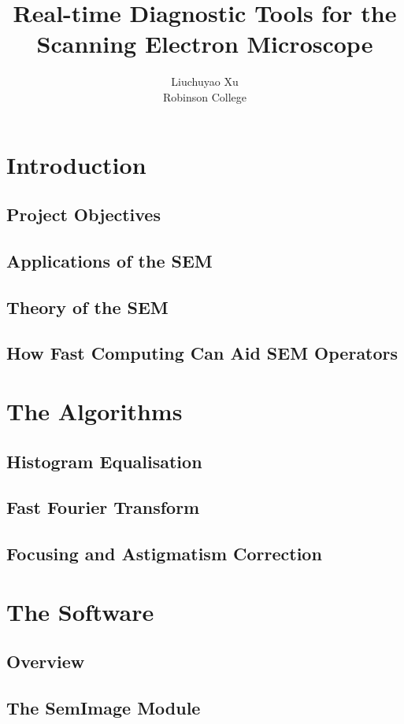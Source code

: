 \documentclass{article}
\title{Real-time Diagnostic Tools for the Scanning Electron Microscope}
\author{Liuchuyao Xu\\Robinson College}
\begin{document}
\maketitle
\tableofcontents
\newpage

\section{Introduction}
\subsection{Project Objectives}

\subsection{Applications of the SEM}
\subsection{Theory of the SEM}
\subsection{How Fast Computing Can Aid SEM Operators}

\section{The Algorithms}
\subsection{Histogram Equalisation}
\subsection{Fast Fourier Transform}
\subsection{Focusing and Astigmatism Correction}

\section{The Software}
\subsection{Overview}
\subsection{The SemImage Module}
\end{document}
